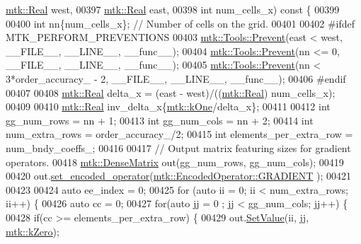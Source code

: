 \begin{DoxyCode}
{{      \hyperlink{group__c01-roots_gac080bbbf5cbb5502c9f00405f894857d}{mtk::Real} west,
00397                                                   \hyperlink{group__c01-roots_gac080bbbf5cbb5502c9f00405f894857d}{mtk::Real} east,
00398                                                   \textcolor{keywordtype}{int} num\_cells\_x)\textcolor{keyword}{ const }\{
00399 
00400   \textcolor{keywordtype}{int} nn\{num\_cells\_x\}; \textcolor{comment}{// Number of cells on the grid.}
00401 
00402 \textcolor{preprocessor}{  #ifdef MTK\_PERFORM\_PREVENTIONS}
00403   \hyperlink{classmtk_1_1Tools_a332324c6f25e66be9dff48c5987a3b9f}{mtk::Tools::Prevent}(east < west, \_\_FILE\_\_, \_\_LINE\_\_, \_\_func\_\_);
00404   \hyperlink{classmtk_1_1Tools_a332324c6f25e66be9dff48c5987a3b9f}{mtk::Tools::Prevent}(nn <= 0, \_\_FILE\_\_, \_\_LINE\_\_, \_\_func\_\_);
00405   \hyperlink{classmtk_1_1Tools_a332324c6f25e66be9dff48c5987a3b9f}{mtk::Tools::Prevent}(nn < 3*order\_accuracy\_ - 2, \_\_FILE\_\_, \_\_LINE\_\_, \_\_func\_\_);
00406 \textcolor{preprocessor}{  #endif}
00407 
00408   \hyperlink{group__c01-roots_gac080bbbf5cbb5502c9f00405f894857d}{mtk::Real} delta\_x = (east - west)/((\hyperlink{group__c01-roots_gac080bbbf5cbb5502c9f00405f894857d}{mtk::Real}) num\_cells\_x);
00409 
00410   \hyperlink{group__c01-roots_gac080bbbf5cbb5502c9f00405f894857d}{mtk::Real} inv\_delta\_x\{\hyperlink{group__c01-roots_ga26407c24d43b6b95480943340d285c71}{mtk::kOne}/delta\_x\};
00411 
00412   \textcolor{keywordtype}{int} gg\_num\_rows = nn + 1;
00413   \textcolor{keywordtype}{int} gg\_num\_cols = nn + 2;
00414   \textcolor{keywordtype}{int} num\_extra\_rows = order\_accuracy\_/2;
00415   \textcolor{keywordtype}{int} elements\_per\_extra\_row = num\_bndy\_coeffs\_;
00416 
00417   \textcolor{comment}{// Output matrix featuring sizes for gradient operators.}
00418   \hyperlink{classmtk_1_1DenseMatrix}{mtk::DenseMatrix} out(gg\_num\_rows, gg\_num\_cols);
00419 
00420   out.\hyperlink{classmtk_1_1DenseMatrix_ac0f824b0fec88c4fb42e77b7550fb0d3}{set\_encoded\_operator}(\hyperlink{namespacemtk_ga9b50023bfb2692219d2915feade94f80a90f70ea2675c36bd9b0b44a79f37a41f}{mtk::EncodedOperator::GRADIENT}
      );
00421 
00423 
00424   \textcolor{keyword}{auto} ee\_index = 0;
00425   \textcolor{keywordflow}{for} (\textcolor{keyword}{auto} ii = 0; ii < num\_extra\_rows; ii++) \{
00426     \textcolor{keyword}{auto} cc = 0;
00427     \textcolor{keywordflow}{for}(\textcolor{keyword}{auto} jj = 0 ; jj < gg\_num\_cols; jj++) \{
00428       \textcolor{keywordflow}{if}(cc >= elements\_per\_extra\_row) \{
00429         out.\hyperlink{classmtk_1_1DenseMatrix_a784ce5784109ac86bfb9d8562b334b13}{SetValue}(ii, jj, \hyperlink{group__c01-roots_ga59a451a5fae30d59649bcda274fea271}{mtk::kZero});
}}
\end{DoxyCode}
